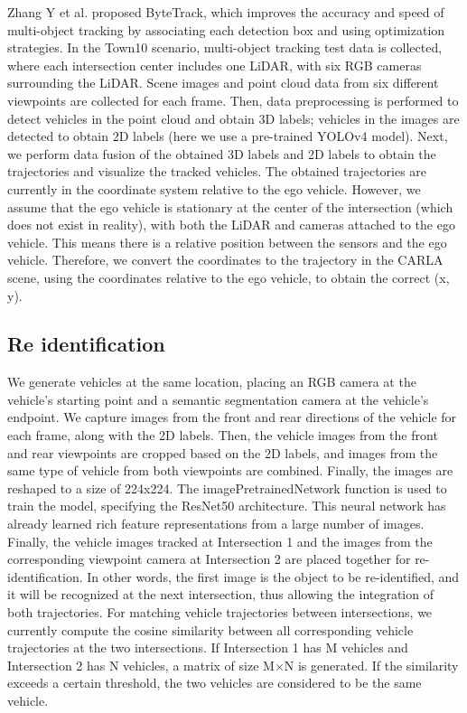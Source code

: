 Zhang Y et al. proposed ByteTrack, which improves the accuracy and speed of multi-object tracking by associating each detection box and using optimization strategies.\cite{Alpher22b}
In the Town10 scenario, multi-object tracking test data is collected, where each intersection center includes one LiDAR, with six RGB cameras surrounding the LiDAR. Scene images and point cloud data from six different viewpoints are collected for each frame.
Then, data preprocessing is performed to detect vehicles in the point cloud and obtain 3D labels; vehicles in the images are detected to obtain 2D labels (here we use a pre-trained YOLOv4 model).
Next, we perform data fusion of the obtained 3D labels and 2D labels to obtain the trajectories and visualize the tracked vehicles.
The obtained trajectories are currently in the coordinate system relative to the ego vehicle. However, we assume that the ego vehicle is stationary at the center of the intersection (which does not exist in reality), with both the LiDAR and cameras attached to the ego vehicle. This means there is a relative position between the sensors and the ego vehicle. Therefore, we convert the coordinates to the trajectory in the CARLA scene, using the coordinates relative to the ego vehicle, to obtain the correct (x, y).

\subsection{Re identification}

We generate vehicles at the same location, placing an RGB camera at the vehicle's starting point and a semantic segmentation camera at the vehicle's endpoint. We capture images from the front and rear directions of the vehicle for each frame, along with the 2D labels.
Then, the vehicle images from the front and rear viewpoints are cropped based on the 2D labels, and images from the same type of vehicle from both viewpoints are combined. Finally, the images are reshaped to a size of 224x224.
The imagePretrainedNetwork function is used to train the model, specifying the ResNet50 architecture. This neural network has already learned rich feature representations from a large number of images.
Finally, the vehicle images tracked at Intersection 1 and the images from the corresponding viewpoint camera at Intersection 2 are placed together for re-identification. In other words, the first image is the object to be re-identified, and it will be recognized at the next intersection, thus allowing the integration of both trajectories.
For matching vehicle trajectories between intersections, we currently compute the cosine similarity between all corresponding vehicle trajectories at the two intersections. If Intersection 1 has M vehicles and Intersection 2 has N vehicles, a matrix of size M×N is generated. If the similarity exceeds a certain threshold, the two vehicles are considered to be the same vehicle.